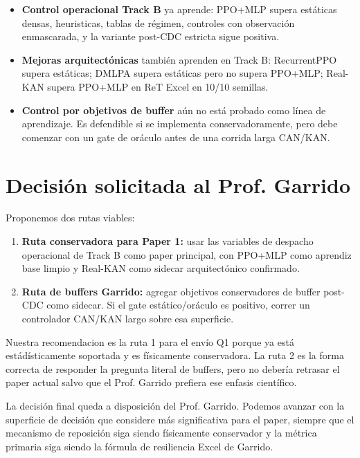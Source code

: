 \documentclass[11pt]{article}
\begin{document}
\begin{itemize}[leftmargin=1.5em]
  \item \textbf{Control operacional Track B} ya aprende: PPO+MLP supera
  estáticas densas, heuristicas, tablas de régimen, controles con observación
  enmascarada, y la variante post-CDC estricta sigue positiva.
  \item \textbf{Mejoras arquitectónicas} también aprenden en Track B:
  RecurrentPPO supera estáticas; DMLPA supera estáticas pero no supera PPO+MLP;
  Real-KAN supera PPO+MLP en ReT Excel en 10/10 semillas.
  \item \textbf{Control por objetivos de buffer} aún no está probado como línea
  de aprendizaje. Es defendible si se implementa conservadoramente, pero debe
  comenzar con un gate de oráculo antes de una corrida larga CAN/KAN.
\end{itemize}

\section*{Decisión solicitada al Prof. Garrido}

Proponemos dos rutas viables:

\begin{enumerate}[leftmargin=1.5em]
  \item \textbf{Ruta conservadora para Paper 1:} usar las variables de despacho
  operacional de Track B como paper principal, con PPO+MLP como aprendiz base
  limpio y Real-KAN como sidecar arquitectónico confirmado.
  \item \textbf{Ruta de buffers Garrido:} agregar objetivos conservadores de
  buffer post-CDC como sidecar. Si el gate estático/oráculo es positivo, correr
  un controlador CAN/KAN largo sobre esa superficie.
\end{enumerate}

Nuestra recomendacion es la ruta 1 para el envío Q1 porque ya está
estádísticamente soportada y es físicamente conservadora. La ruta 2 es la forma
correcta de responder la pregunta literal de buffers, pero no debería retrasar
el paper actual salvo que el Prof. Garrido prefiera ese enfasis científico.

La decisión final queda a disposición del Prof. Garrido. Podemos avanzar con la
superficie de decisión que considere más significativa para el paper, siempre
que el mecanismo de reposición siga siendo físicamente conservador y la métrica
primaria siga siendo la fórmula de resiliencia Excel de Garrido.
\end{document}
